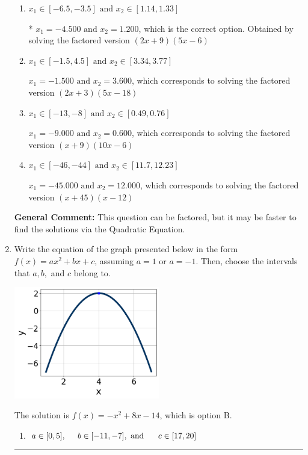 \documentclass{extbook}[14pt]
\newcommand{\litem}[1]{\item #1

\rule{\textwidth}{0.4pt}}
\begin{document}
\begin{enumerate}
{\begin{enumerate}[label=\Alph*.]
$x_1 = -13.500 \text{ and } x_2 = 0.400$, which corresponds to solving the factored version $(2x + 27)(5x -2)$
\item \( x_1 \in [-6.5, -3.5] \text{ and } x_2 \in [1.14, 1.33] \)

* $x_1 = -4.500 \text{ and } x_2 = 1.200$, which is the correct option. Obtained by solving the factored version $(2x + 9)(5x -6)$
\item \( x_1 \in [-1.5, 4.5] \text{ and } x_2 \in [3.34, 3.77] \)

$x_1 = -1.500 \text{ and } x_2 = 3.600$, which corresponds to solving the factored version $(2x + 3)(5x -18)$
\item \( x_1 \in [-13, -8] \text{ and } x_2 \in [0.49, 0.76] \)

$x_1 = -9.000 \text{ and } x_2 = 0.600$, which corresponds to solving the factored version $(x + 9)(10x -6)$
\item \( x_1 \in [-46, -44] \text{ and } x_2 \in [11.7, 12.23] \)

$x_1 = -45.000 \text{ and } x_2 = 12.000$, which corresponds to solving the factored version $(x + 45)(x -12)$
\end{enumerate}

\textbf{General Comment:} This question can be factored, but it may be faster to find the solutions via the Quadratic Equation.
}
\litem{
Write the equation of the graph presented below in the form $f(x)=ax^2+bx+c$, assuming  $a=1$ or $a=-1$. Then, choose the intervals that $a, b,$ and $c$ belong to.

\begin{center}
    \includegraphics[width=0.5\textwidth]{../Figures/quadraticGraphToEquationCopyC.png}
\end{center}


The solution is \( f(x) = -x^{2} +8 x -14 \), which is option B.\begin{enumerate}[label=\Alph*.]
\item \( a \in [0, 5], \hspace*{5mm} b \in [-11, -7], \text{ and } \hspace*{5mm} c \in [17, 20] \)


\end{enumerate}}
\end{enumerate}
\end{document}
